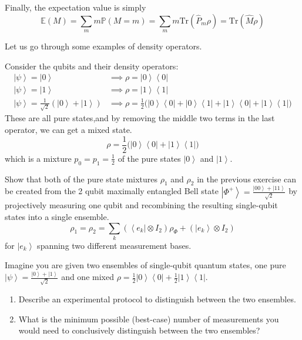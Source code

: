 \documentclass{article}
\newcommand{\ket}[1]{\ensuremath{\left|#1\right\rangle}}
\newcommand{\bra}[1]{\ensuremath{\left\langle#1\right|}}
\begin{document}
    \begin{lemma}
      Finally, the expectation value is simply 
      \begin{equation}
        \mathbb{E}(M) = \sum_m m \mathbb{P}(M = m) = \sum_m m \mathrm{Tr}(\hat{P}_m \rho) = \mathrm{Tr}(\hat{M} \rho)
      \end{equation}
    \end{lemma}

    Let us go through some examples of density operators. 

    \begin{example}
      Consider the qubits and their density operators: 
      \begin{align} 
        \ket{\psi} = \ket{0} & \implies \rho = \ket{0} \bra{0} \\
        \ket{\psi} = \ket{1} & \implies \rho = \ket{1} \bra{1} \\
        \ket{\psi} = \frac{1}{\sqrt{2}} ( \ket{0} + \ket{1}) & \implies \rho = \frac{1}{2} \big( \ket{0} \bra{0} + \ket{0} \bra{1} + \ket{1} \bra{0} + \ket{1} \bra{1} \big) 
      \end{align}
      These are all pure states,and by removing the middle two terms in the last operator, we can get a mixed state. 
      \begin{equation} 
        \rho = \frac{1}{2} \big( \ket{0} \bra{0} + \ket{1} \bra{1} \big) 
      \end{equation}
      which is a mixture $p_0 = p_1 = \frac{1}{2}$ of the pure states $\ket{0}$ and $\ket{1}$. 
    \end{example}

    \begin{exercise}
      Show that both of the pure state mixtures $\rho_1$ and $\rho_2$ in the previous exercise can be created from the 2 qubit maximally entangled Bell state $\ket{\Phi^+} = \frac{\ket{00} + \ket{11}}{\sqrt{2}}$ by projectively measuring one qubit and recombining the resulting single-qubit states into a single ensemble. 
      \begin{equation}
        \rho_1 = \rho_2 = \sum_k ( \bra{e_k} \otimes I_2) \rho_{\Phi} + (\ket{e_k} \otimes I_2)
      \end{equation}
      for $\ket{e_k}$ spanning two different measurement bases. 
    \end{exercise}

    \begin{exercise}
      Imagine you are given two ensembles of single-qubit quantum states, one pure $\ket{\psi} = \frac{\ket{0} + \ket{1}}{\sqrt{2}}$ and one mixed $\rho = \frac{1}{2} \ket{0} \bra{0} + \frac{1}{2} \ket{1} \bra{1}$. 
      \begin{enumerate}
        \item Describe an experimental protocol to distinguish between the two ensembles. 
        \item What is the minimum possible (best-case) number of measurements you would need to conclusively distinguish between the two ensembles? 
      \end{enumerate}
    \end{exercise}
\end{document}
